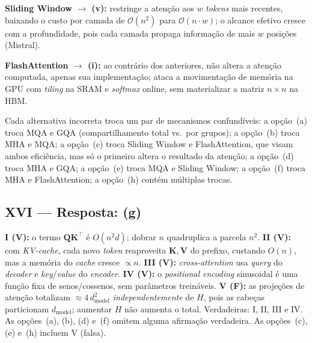 \documentclass{dlproblemset}
\begin{document}
\textbf{Sliding Window $\to$ (v):} restringe a atenção aos $w$ \textit{tokens} mais
recentes, baixando o custo por camada de $\mathcal{O}(n^2)$ para
$\mathcal{O}(n \cdot w)$; o alcance efetivo cresce com a profundidade, pois cada camada
propaga informação de mais $w$ posições (Mistral).

\textbf{FlashAttention $\to$ (i):} ao contrário dos anteriores, não altera a atenção
computada, apenas sua implementação; ataca a movimentação de memória na GPU com
\textit{tiling} na SRAM e \textit{softmax} online, sem materializar a matriz
$n \times n$ na HBM.

Cada alternativa incorreta troca um par de mecanismos confundíveis: a opção~(a) troca
MQA e GQA (compartilhamento total vs.\ por grupos); a opção~(b) troca MHA e MQA; a
opção~(c) troca Sliding Window e FlashAttention, que visam ambos eficiência, mas só o
primeiro altera o resultado da atenção; a opção~(d) troca MHA e
GQA; a opção~(e) troca MQA e Sliding Window; a opção~(f) troca MHA e FlashAttention; a
opção~(h) contém múltiplas trocas.

\subsection*{XVI — Resposta: (g)}
\textbf{I (V):} o termo $\mathbf{Q}\mathbf{K}^\top$ é $O(n^2 d)$; dobrar $n$ quadruplica
a parcela $n^2$.
\textbf{II (V):} com \textit{KV-cache}, cada novo \textit{token} reaproveita
$\mathbf{K}, \mathbf{V}$ do prefixo, custando $O(n)$, mas a memória do \textit{cache}
cresce $\propto n$.
\textbf{III (V):} \textit{cross-attention} usa \textit{query} do \textit{decoder} e
\textit{key}/\textit{value} do \textit{encoder}.
\textbf{IV (V):} o \textit{positional encoding} sinusoidal é uma função fixa de
senos/cossenos, sem parâmetros treináveis.
\textbf{V (F):} as projeções de atenção totalizam $\approx 4\,d_{\text{model}}^2$
\emph{independentemente} de $H$, pois as cabeças particionam $d_{\text{model}}$;
aumentar $H$ não aumenta o total.
Verdadeiras: I, II, III e IV.
As opções~(a), (b), (d) e~(f) omitem alguma afirmação verdadeira.
As opções~(c), (e) e~(h) incluem V (falsa).

\end{document}
